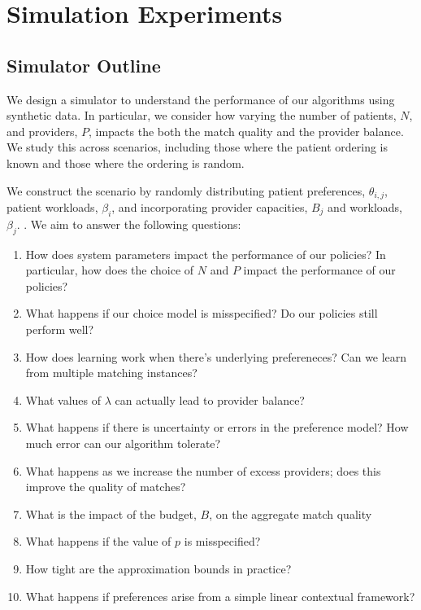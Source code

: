 \section{Simulation Experiments}
\subsection{Simulator Outline}
We design a simulator to understand the performance of our algorithms using synthetic data. 
In particular, we consider how varying the number of patients, $N$, and providers, $P$, impacts the both the match quality and the provider balance. 
We study this across scenarios, including those where the patient ordering is known and those where the ordering is random. 

We construct the scenario by randomly distributing patient preferences, $\theta_{i,j}$, patient workloads, $\beta_{i}$, and incorporating provider capacities, $B_{j}$ and workloads, $\beta_{j}$. 
. 
We aim to answer the following questions: 
\begin{enumerate}
    \item How does system parameters impact the performance of our policies? In particular, how does the choice of $N$ and $P$ impact the performance of our policies? 
    \item What happens if our choice model is misspecified? Do our policies still perform well? 
    \item How does learning work when there's underlying prefereneces? Can we learn from multiple matching instances? 
    \item What values of $\lambda$ can actually lead to provider balance? 
    \item What happens if there is uncertainty or errors in the preference model? How much error can our algorithm tolerate? 
    \item What happens as we increase the number of excess providers; does this improve the quality of matches? 
    \item What is the impact of the budget, $B$, on the aggregate match quality
    \item What happens if the value of $p$ is misspecified? 
    \item How tight are the approximation bounds in practice? 
    \item What happens if preferences arise from a simple linear contextual framework? 
\end{enumerate}